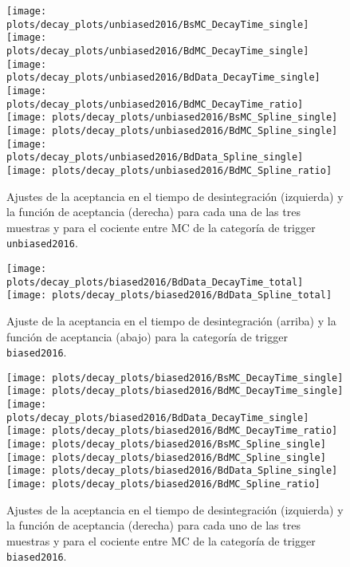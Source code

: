 \begin{figure}[H]
\centering
\begin{multicols}{2}
\texttt{[image: plots/decay\_plots/unbiased2016/BsMC\_DecayTime\_single]}
\texttt{[image: plots/decay\_plots/unbiased2016/BdMC\_DecayTime\_single]}
\texttt{[image: plots/decay\_plots/unbiased2016/BdData\_DecayTime\_single]}
\texttt{[image: plots/decay\_plots/unbiased2016/BdMC\_DecayTime\_ratio]}
\texttt{[image: plots/decay\_plots/unbiased2016/BsMC\_Spline\_single]}
\texttt{[image: plots/decay\_plots/unbiased2016/BdMC\_Spline\_single]}
\texttt{[image: plots/decay\_plots/unbiased2016/BdData\_Spline\_single]}
\texttt{[image: plots/decay\_plots/unbiased2016/BdMC\_Spline\_ratio]}
\end{multicols}
\caption{Ajustes de la aceptancia en el tiempo de desintegración (izquierda) y la función de aceptancia (derecha) para cada una de las tres muestras y para el cociente entre MC de la categoría de trigger \texttt{unbiased2016}.}  \label{fig:acctimeotherunbiased2016}
\end{figure}


\begin{figure}[H]
\centering
\texttt{[image: plots/decay\_plots/biased2016/BdData\_DecayTime\_total]}
\texttt{[image: plots/decay\_plots/biased2016/BdData\_Spline\_total]}
\caption{Ajuste de la aceptancia en el tiempo de desintegración (arriba) y la función de aceptancia (abajo) para la categoría de trigger \texttt{biased2016}.}  \label{fig:acctimebsdatabiased2016}
\end{figure}


\begin{figure}[H]
\centering
\begin{multicols}{2}
\texttt{[image: plots/decay\_plots/biased2016/BsMC\_DecayTime\_single]}
\texttt{[image: plots/decay\_plots/biased2016/BdMC\_DecayTime\_single]}
\texttt{[image: plots/decay\_plots/biased2016/BdData\_DecayTime\_single]}
\texttt{[image: plots/decay\_plots/biased2016/BdMC\_DecayTime\_ratio]}
\texttt{[image: plots/decay\_plots/biased2016/BsMC\_Spline\_single]}
\texttt{[image: plots/decay\_plots/biased2016/BdMC\_Spline\_single]}
\texttt{[image: plots/decay\_plots/biased2016/BdData\_Spline\_single]}
\texttt{[image: plots/decay\_plots/biased2016/BdMC\_Spline\_ratio]}
\end{multicols}
\caption{Ajustes de la aceptancia en el tiempo de desintegración (izquierda) y la función de aceptancia (derecha) para cada uno de las tres muestras y para el cociente entre MC de la categoría de trigger \texttt{biased2016}.}  \label{fig:acctimeotherbiased2016}
\end{figure}



